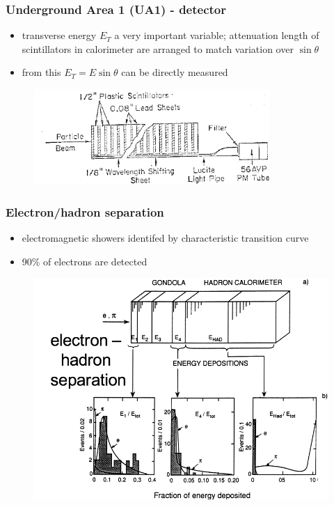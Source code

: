 \documentclass[xcolor=table]{beamer}
\begin{document}
\begin{frame}
\frametitle{Underground Area 1 (UA1) - detector}
\fontsize{9pt}{12}\selectfont


\begin{itemize}
\item transverse energy $E_T$ a very important variable; attenuation length of scintillators in calorimeter are arranged to match variation over $\sin\theta$
\item from this $E_T=E\sin\theta$ can be directly measured
\end{itemize}

\begin{figure}[h]
\centering
\includegraphics[width=0.8\textwidth]{images/gondola-scintillators.png}
\end{figure}


\end{frame}

\begin{frame}
\frametitle{Electron/hadron separation}
\fontsize{9pt}{12}\selectfont


\begin{itemize}
\item electromagnetic showers identifed by characteristic transition curve
\item 90\% of electrons are detected
\end{itemize}

\begin{figure}[h]
\centering
\includegraphics[height=0.6\textheight]{images/e-hadron-separation.png}
\end{figure}


\end{frame}
\end{document}
